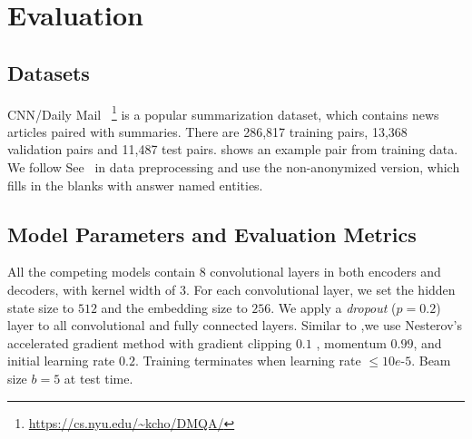\section{Evaluation}
\label{sec:eval}

\subsection{Datasets}
CNN/Daily Mail~\cite{HermannKGEKSB15}
\footnote{\url{https://cs.nyu.edu/~kcho/DMQA/}} 
is a popular summarization dataset, 
which contains news articles paired with summaries.
There are 286,817 training pairs,
13,368 validation pairs and 11,487 test pairs.
 shows an example pair from training data.
We follow See~\cite{SeeLM17} in data preprocessing and use 
the non-anonymized version, which fills in the blanks with answer named entities.


\subsection{Model Parameters and Evaluation Metrics}
\label{sec:expset}
All the competing models contain $8$ convolutional layers in
both encoders and decoders, with kernel width of $3$.
For each convolutional layer, 
we set the hidden state size to $512$ and the embedding size to $256$.
We apply a \textit{dropout} ($p=0.2$) layer to 
all convolutional and fully connected layers.
Similar to \cite{gehring2017convs2s},we use Nesterov's
accelerated gradient method \cite{SutskeverMDH13} with gradient clipping $0.1$ \cite{PascanuMB13}, momentum $0.99$,
and initial learning rate $0.2$.
Training terminates when learning rate $\le 10e$-$5$.
Beam size $b=5$ at test time.

